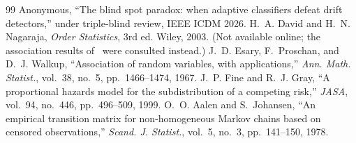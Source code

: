 \documentclass[10pt,a4paper]{article}
\begin{document}
{\begin{thebibliography}{99}
 Anonymous, ``The blind spot paradox: when adaptive classifiers defeat drift detectors,'' under triple-blind review, IEEE ICDM 2026.
 H.~A. David and H.~N. Nagaraja, \emph{Order Statistics}, 3rd ed. Wiley, 2003. (Not available online; the association results of~\cite{esary1967} were consulted instead.)
 J.~D. Esary, F.~Proschan, and D.~J. Walkup, ``Association of random variables, with applications,'' \emph{Ann. Math. Statist.}, vol.~38, no.~5, pp.~1466--1474, 1967.
 J.~P. Fine and R.~J. Gray, ``A proportional hazards model for the subdistribution of a competing risk,'' \emph{JASA}, vol.~94, no.~446, pp.~496--509, 1999.
 O.~O. Aalen and S.~Johansen, ``An empirical transition matrix for non-homogeneous Markov chains based on censored observations,'' \emph{Scand. J. Statist.}, vol.~5, no.~3, pp.~141--150, 1978.
\end{thebibliography}
}
\end{document}
